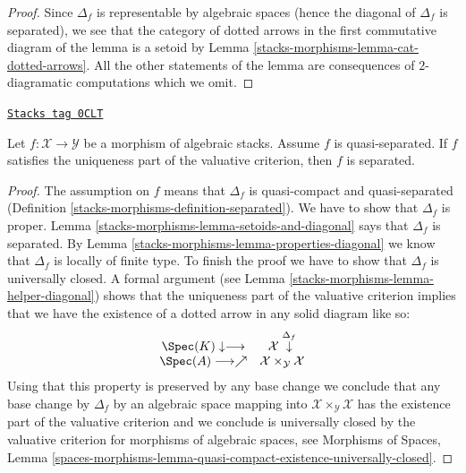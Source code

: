 \begin{proof}
Since $\Delta_f$ is representable by algebraic spaces (hence the diagonal
of $\Delta_f$ is separated), we see that the category of dotted arrows
in the first commutative diagram of the lemma is a setoid by
Lemma \ref{stacks-morphisms-lemma-cat-dotted-arrows}. All the other statements
of the lemma are consequences of $2$-diagramatic
computations which we omit.
\end{proof}

\begin{lemma}
\label{stacks-morphisms-lemma-uniqueness-and-diagonal}
\href{https://stacks.math.columbia.edu/tag/0CLT}{\texttt{Stacks tag 0CLT}}

Let $f : \mathcal{X} \to \mathcal{Y}$ be a morphism of algebraic stacks.
Assume $f$ is quasi-separated.
If $f$ satisfies the uniqueness part of the valuative criterion,
then $f$ is separated.
\end{lemma}

\begin{proof}
The assumption on $f$ means that $\Delta_f$ is quasi-compact
and quasi-separated (Definition \ref{stacks-morphisms-definition-separated}).
We have to show that $\Delta_f$ is proper.
Lemma \ref{stacks-morphisms-lemma-setoids-and-diagonal} says that $\Delta_f$
is separated. By Lemma \ref{stacks-morphisms-lemma-properties-diagonal}
we know that $\Delta_f$ is locally of finite type.
To finish the proof we have to show that
$\Delta_f$ is universally closed. A formal argument
(see Lemma \ref{stacks-morphisms-lemma-helper-diagonal}) shows that
the uniqueness part of the valuative criterion implies
that we have the existence of a dotted arrow in any solid diagram like so:
$$
\begin{array}{cc}\Spec(K) \downarrow\longrightarrow & \mathcal{X} \overset{\Delta_f}{\downarrow} \\ \Spec(A) \longrightarrow\nearrow & \mathcal{X} \times_\mathcal{Y} \mathcal{X}\end{array}
$$
Using that this property is preserved by any base change
we conclude that any base change by $\Delta_f$ by an algebraic
space mapping into $\mathcal{X} \times_\mathcal{Y} \mathcal{X}$
has the existence part of the valuative criterion and
we conclude is universally closed by the valuative criterion
for morphisms of algebraic spaces, see
Morphisms of Spaces, Lemma
\ref{spaces-morphisms-lemma-quasi-compact-existence-universally-closed}.
\end{proof}

